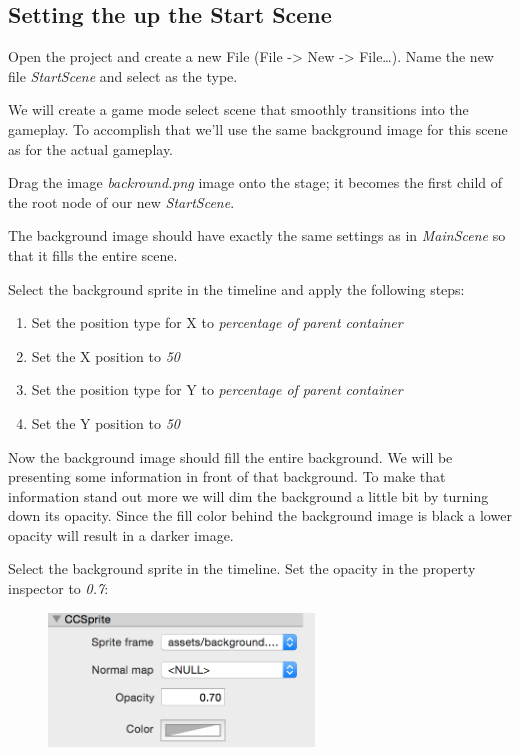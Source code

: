 \subsection{Setting the up the Start Scene}

\begin{leftbar}
Open the \SB{} project and create a new File (File -> New -> File\ldots). Name
the new file \textit{StartScene} and select  as the type.
\end{leftbar}

We will create a game mode select scene that smoothly transitions into the
gameplay. To accomplish that we'll use the same background image for this scene
as for the actual gameplay. 

\begin{leftbar}
Drag the image \textit{backround.png} image onto the stage; it becomes the first
child of the root node of our new \textit{StartScene}.
\end{leftbar}

The background image should have exactly the same settings as in
\textit{MainScene} so that it fills the entire scene.

\begin{leftbar}
Select the background sprite in the timeline and apply the following steps:
\begin{enumerate}
  \item Set the position type for X to \textit{percentage of parent container}
  \item Set the X position to \textit{50}
  \item Set the position type for Y to \textit{percentage of parent container}
  \item Set the Y position to \textit{50}
\end{enumerate}
\end{leftbar}

Now the background image should fill the entire background. We will be
presenting some information in front of that background. To make that
information stand out more we will dim the background a little bit by turning
down its opacity. Since the fill color behind the background image is black a
lower opacity will result in a darker image.

\begin{leftbar}
Select the background sprite in the timeline. Set the opacity in the property
inspector to \textit{0.7}:
\begin{figure}[H]
		\centering
		\includegraphics[width=200pt]{images/Chapter6/opacity_lower.png}
\end{figure}
\end{leftbar}

